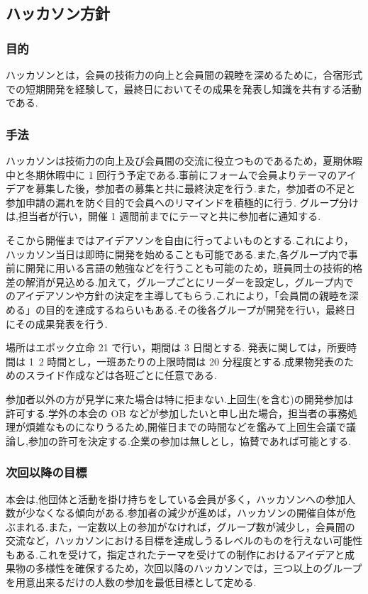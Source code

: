 \subsection*{ハッカソン方針}

\subsubsection*{目的}
ハッカソンとは，会員の技術力の向上と会員間の親睦を深めるために，合宿形式での短期開発を経験して，最終日においてその成果を発表し知識を共有する活動である.


\subsubsection*{手法}
ハッカソンは技術力の向上及び会員間の交流に役立つものであるため，夏期休暇中と冬期休暇中に 1 回行う予定である.事前にフォームで会員よりテーマのアイデアを募集した後，参加者の募集と共に最終決定を行う.また，参加者の不足と参加申請の漏れを防ぐ目的で会員へのリマインドを積極的に行う.
グループ分けは,担当者が行い，開催 1 週間前までにテーマと共に参加者に通知する.

そこから開催まではアイデアソンを自由に行ってよいものとする.これにより，ハッカソン当日は即時に開発を始めることも可能である.また,各グループ内で事前に開発に用いる言語の勉強などを行うことも可能のため，班員同士の技術的格差の解消が見込める.加えて，グループごとにリーダーを設定し，グループ内でのアイデアソンや方針の決定を主導してもらう.これにより，「会員間の親睦を深める」の目的を達成するねらいもある.その後各グループが開発を行い，最終日にその成果発表を行う.

場所はエポック立命 21 で行い，期間は 3 日間とする.
発表に関しては，所要時間は 1~2 時間とし，一班あたりの上限時間は 20 分程度とする.成果物発表のためのスライド作成などは各班ごとに任意である.

参加者以外の方が見学に来た場合は特に拒まない.上回生(\fourthGrade を含む)の開発参加は許可する.学外の本会の OB などが参加したいと申し出た場合，担当者の事務処理が煩雑なものになりうるため,開催日までの時間などを鑑みて上回生会議で議論し,参加の許可を決定する.企業の参加は無しとし，協賛であれば可能とする.



\subsubsection*{次回以降の目標}
本会は,他団体と活動を掛け持ちをしている会員が多く，ハッカソンへの参加人数が少なくなる傾向がある.参加者の減少が進めば，ハッカソンの開催自体が危ぶまれる.また，一定数以上の参加がなければ，グループ数が減少し，会員間の交流など，ハッカソンにおける目標を達成しうるレベルのものを行えない可能性もある.これを受けて，指定されたテーマを受けての制作におけるアイデアと成果物の多様性を確保するため，次回以降のハッカソンでは，三つ以上のグループを用意出来るだけの人数の参加を最低目標として定める.\\

